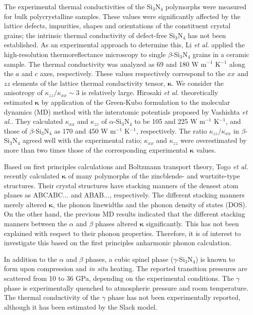 \documentclass[twocolumn,amsmath,amssymb,a4paper,prb,superscriptaddress,floatfix]{revtex4-1}
\begin{document}
The experimental thermal conductivities
\cite{zhou,hirao-rev,watari,hirosaki,hirai} of the Si$_3$N$_4$ polymorphs were
measured for bulk polycrystalline samples. These values were significantly
affected by the lattice defects, impurities, shapes and orientations of the
constituent crystal grains;\cite{hirosaki-md} the intrinsic thermal conductivity
of defect-free Si$_3$N$_4$ has not been established. As an experimental approach
to determine this, Li {\it et al.}\cite{li} applied the high-resolution
thermoreflectance microscopy to single $\beta$-Si$_3$N$_4$ grains in a ceramic
sample. The thermal conductivity was analyzed as 69 and 180 W m$^{-1}$ K$^{-1}$
along the $a$ and $c$ axes, respectively.  These values respectively correspond
to the $xx$ and $zz$ elements of the lattice thermal conductivity tensor,
$\boldsymbol{\kappa}$. We consider the anisotropy of
$\kappa_{zz}/\kappa_{xx}\sim 3$ is relatively large. Hirosaki {\it et
al.}\cite{hirosaki-md} theoretically estimated $\boldsymbol{\kappa}$ by
application of the Green-Kubo formulation to the molecular dynamics (MD) method
with the interatomic potentials proposed by Vashishta {\it et
al.}\cite{vashishta}.  They calculated $\kappa$$_{xx}$ and $\kappa$$_{zz}$ of
$\alpha$-Si$_3$N$_4$ to be 105 and 225 W m$^{-1}$ K$^{-1}$, and those of
$\beta$-Si$_3$N$_4$ as 170 and 450 W m$^{-1}$ K$^{-1}$, respectively.  The ratio
$\kappa_{zz}/\kappa_{xx}$ in $\beta$-Si$_3$N$_4$ agreed well with the
experimental ratio; $\kappa_{xx}$ and $\kappa_{zz}$ were overestimated by more
than two times those 
of the corresponding experimental $\boldsymbol{\kappa}$ values. 

Based on first principles calculations and Boltzmann transport
theory\cite{phono3py}, Togo {\it{et al.}} recently calculated
$\boldsymbol{\kappa}$ of many polymorphs of the zincblende- and wurtzite-type
structures. Their crystal structures have stacking manners of the densest atom
planes as ABCABC... and ABAB..., respectively. The different stacking manners
merely altered $\boldsymbol{\kappa}$, the phonon linewidths and the phonon
density of states (DOS).\cite{phono3py} On the other hand, the previous MD
results indicated that the different stacking manners between the $\alpha$ and
$\beta$ phases altered $\boldsymbol{\kappa}$ significantly. This has not been
explained with respect to their phonon properties. Therefore, it is of interest
to investigate this based on the first principles anharmonic phonon calculation.

In addition to the $\alpha$ and $\beta$ phases, a cubic spinel phase
($\gamma$-Si$_3$N$_4$) is known to form upon compression and {\it{in situ}}
heating.\cite{zerr,zhang} The reported transition pressures are scattered from
10 to 36 GPa, depending on the experimental conditions.\cite{xu}  The $\gamma$
phase is experimentally quenched to atmospheric pressure and room temperature.
The thermal conductivity of the $\gamma$ phase has not been experimentally
reported, although it has been estimated by the Slack model.\cite{morelli} 
\end{document}
